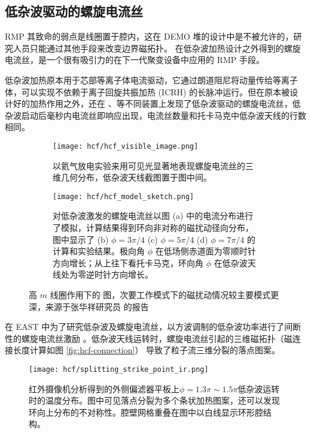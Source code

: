 \subsection{低杂波驱动的螺旋电流丝}
RMP 其致命的弱点是线圈置于腔内，这在 DEMO 堆的设计中是不被允许的，研究人员只能通过其他手段来改变边界磁拓扑。 在低杂波加热设计之外得到的螺旋电流丝，是一个很有吸引力的在下一代聚变设备中应用的 RMP 手段。

低杂波加热原本用于芯部等离子体电流驱动，它通过朗道阻尼将动量传给等离子体，可以实现不依赖于离子回旋共振加热 (ICRH) 的长脉冲\Hmode 运行。但在原本被设计好的加热作用之外，还在 \ddd、\east 等不同装置上发现了低杂波驱动的螺旋电流丝，低杂波启动后毫秒内电流丝即响应出现，电流丝数量和托卡马克中低杂波天线的行数相同。


\begin{figure}[htbp]
    \centering%
    \begin{subfigure}{0.45\textwidth}
        \texttt{[image: hcf/hcf\_visible\_image.png]}
        \caption{\east 以氦气放电实验来用可见光显著地表现螺旋电流丝的三维几何分布，低杂波天线截图置于图中间。}
    \end{subfigure}
    \begin{subfigure}{0.45\textwidth}
        \texttt{[image: hcf/hcf\_model\_sketch.png]}
        \caption{对低杂波激发的螺旋电流丝以图 (a) 中的电流分布进行了模拟，计算结果得到环向非对称的磁扰动径向分布，图中显示了 (b) $\phi=3\pi/4$  (c) $\phi=5\pi/4$  (d) $\phi=7\pi/4$ 的计算和实验结果。极向角 $\phi$ 在低场侧赤道面为零顺时针方向增长；从上往下看托卡马克，环向角 $\phi$ 在低杂波天线处为零逆时针方向增长。}
    \end{subfigure}
    \caption{高 $m$ 线圈作用下的 \Poincare 图，次要工作模式下的磁扰动情况较主要模式更深，来源于张华祥研究员 \cite{zhang_highm} 的报告}
    \label{fig:highm-stretched-poincare}
\end{figure}
  

在 EAST 中为了研究低杂波及螺旋电流丝，以方波调制的低杂波功率进行了间断性的螺旋电流丝激励 。低杂波天线运转时，螺旋电流丝引起的三维磁拓扑（磁连接长度计算如图 \ref{fig:hcf-connection}） 导致了粒子流三维分裂的落点图案。\cite{the_east_team_magnetic_2013}

\begin{figure}[htbp]
    \centering%
        \texttt{[image: hcf/splitting\_strike\_point\_ir.png]}
        \caption{红外摄像机分析得到的\east 外侧偏滤器平板上$\phi=1.3\pi\sim 1.5\pi$低杂波运转时的温度分布。图中可见落点分裂为多个条状加热图案，还可以发现环向上分布的不对称性。腔壁网格重叠在图中以白线显示环形腔结构。}
        \label{fig:hcf-strike-point}
\end{figure}

